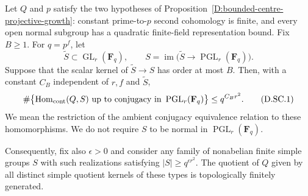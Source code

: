 \begin{proposition}
\label{D:bounded-scalar-projective-growth}
Let $Q$ and $p$ satisfy the two hypotheses of
Proposition~\ref{D:bounded-centre-projective-growth}: constant
prime-to-$p$ second cohomology is finite, and every open normal
subgroup has a quadratic finite-field representation bound.
Fix $B\ge1$. For $q=p^f$, let
\[
 \widetilde S\subset\operatorname{GL}_r(\mathbf F_q),\qquad
 S=\operatorname{im}\bigl(\widetilde S\longrightarrow
                         \operatorname{PGL}_r(\mathbf F_q)\bigr).
\]
Suppose that the scalar kernel of $\widetilde S\to S$ has order at
most $B$. Then, with a constant $C_B$ independent of $r,f$ and
$\widetilde S$,
\[
 \#\bigl\{\operatorname{Hom}_{\rm cont}(Q,S)
             \text{ up to conjugacy in }
                    \operatorname{PGL}_r(\mathbf F_q)\bigr\}
       \le q^{C_Br^2}.                                  \tag{D.SC.1}
\]
We mean the restriction of the ambient conjugacy equivalence
relation to these homomorphisms. We do not require $S$ to be normal
in $\operatorname{PGL}_r(\mathbf F_q)$.

Consequently, fix also $\epsilon>0$ and consider any family of
nonabelian finite simple groups $S$ with such realizations satisfying
$|S|\ge q^{\epsilon r^2}$. The quotient of $Q$ given by all distinct
simple quotient kernels of these types is topologically finitely
generated.
\end{proposition}
